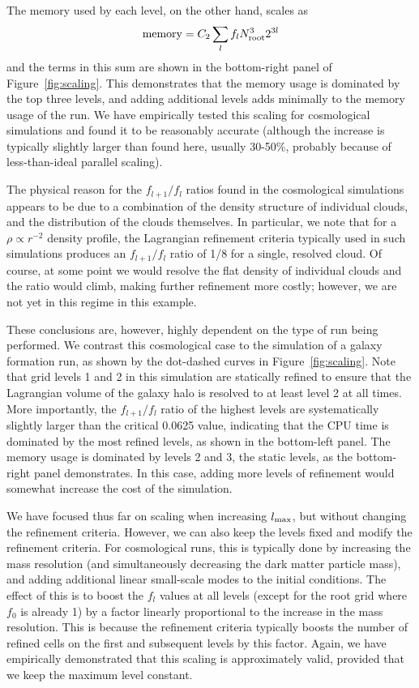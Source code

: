 The memory used by each level, on the other hand, scales as
\begin{equation}
{\rm memory} = C_2 \sum_l f_l N_{\rm root}^3 2^{3l}
\end{equation}
and the terms in this sum are shown in the bottom-right panel of
Figure~\ref{fig:scaling}.  This demonstrates that the memory usage is
dominated by the top three levels, and adding additional levels 
adds minimally to the memory usage of the run.  We have empirically
tested this scaling for cosmological simulations and found it to be
reasonably accurate (although the increase is typically slightly
larger than found here, usually 30-50\%, probably because of
less-than-ideal parallel scaling).

The physical reason for the $f_{l+1}/f_l$ ratios found in the
cosmological simulations appears to be due to a combination of the
density structure of individual clouds, and the distribution of the
clouds themselves.  In particular, we note that for a $\rho \propto
r^{-2}$ density profile, the Lagrangian refinement criteria typically used in
such simulations produces an $f_{l+1}/f_l$ ratio of 1/8 for a single,
resolved cloud.  Of course, at some point we would resolve the flat
density of individual clouds and the ratio would climb, making further
refinement more costly; however, we are not yet in this regime in this
example.

These conclusions are, however, highly dependent on the type of run
being performed.  We contrast this cosmological case to the simulation
of a galaxy formation run, as shown by the dot-dashed curves in
Figure~\ref{fig:scaling}.  Note that grid levels 1 and 2 in this simulation are statically
refined to ensure that the Lagrangian volume of the galaxy halo is resolved
to at least level 2 at all times. More importantly, the
$f_{l+1}/f_{l}$ ratio of the highest levels are systematically
slightly larger than the critical 0.0625 value, indicating that the
CPU time is dominated by the most refined levels, as shown in the
bottom-left panel.  The memory usage is dominated by levels 2 and 3,
the static levels, as the bottom-right panel demonstrates.  In this
case, adding more levels of refinement would somewhat increase the
cost of the simulation.

We have focused thus far on scaling when increasing $l_{\rm max}$, but
without changing the refinement criteria.  However, we can also keep
the levels fixed and modify the refinement criteria.  For cosmological
runs, this is typically done by increasing the mass resolution (and
simultaneously decreasing the dark matter particle mass), and adding
additional linear small-scale modes to the initial conditions.  The
effect of this is to boost the $f_l$ values at all levels (except for
the root grid where $f_0$ is already 1) by a factor linearly
proportional to the increase in the mass resolution.  This is because
the refinement criteria typically boosts the number of refined cells
on the first and subsequent levels by this factor.  Again, we have
empirically demonstrated that this scaling is approximately valid,
provided that we keep the maximum level constant.

